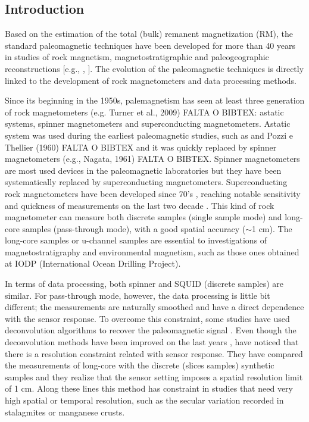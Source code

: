 \documentclass[galley,gc]{agutex}
\begin{document}
\begin{article}




\section{Introduction}
\label{sec:Introduction}

Based on the estimation of the total (bulk) remanent magnetization (RM), 
the standard paleomagnetic techniques have been developed for more than 
40 years in studies of rock magnetism, magnetostratigraphic and 
paleogeographic reconstructions [e.g., \citeauthor{voo1993}, \citeyear{voo1993}]. 
The evolution of the paleomagnetic techniques is directly linked to 
the development of rock magnetometers and data processing methods. 

Since its beginning in the 1950s, 
palemagnetism has seen at least three generation of rock magnetometers 
(e.g. Turner et al., 2009) FALTA O BIBTEX: astatic systems, 
spinner magnetometers and superconducting magnetometers. 
Astatic system was used during the earliest paleomagnetic studies, 
such as \citet{blackett1952} and Pozzi e Thellier (1960) FALTA O BIBTEX 
and it was quickly replaced by spinner magnetometers (e.g., Nagata, 1961) FALTA O BIBTEX. 
Spinner magnetometers are most used devices in the paleomagnetic 
laboratories but they have been systematically replaced by 
superconducting magnetometers. Superconducting rock magnetometers 
have been developed since 70’s \citep{dodson1974, goree-fuller1976}, 
reaching notable sensitivity and quickness of measurements on the last two decade 
\citep{kirschvink2015}. 
This kind of rock magnetometer can measure both discrete samples 
(single sample mode) and long-core samples (pass-through mode), 
with a good spatial accuracy ($\sim$1 cm).
The long-core samples or u-channel samples are essential to 
investigations of magnetostratigraphy and environmental magnetism, 
such as those ones obtained at IODP (International Ocean Drilling Project). 

In terms of data processing, both spinner and SQUID (discrete samples) 
are similar. For pass-through mode, however, the data 
processing is little bit different; the measurements are naturally 
smoothed and have a direct dependence with the sensor response. 
To overcome this constraint, some studies have used deconvolution 
algorithms to recover the paleomagnetic signal 
\citep{jackson2010, oda-xuan2014}. 
Even though the deconvolution methods have been improved on the 
last years \citep{jackson2010, lascu2012}, \citet{lascu2012} have 
noticed that there is a resolution constraint related with sensor 
response. They have compared the measurements of long-core with 
the discrete (slices samples) synthetic samples and they realize 
that the sensor setting imposes a spatial resolution limit of 1 cm. 
Along these lines this method has constraint in studies that need 
very high spatial or temporal resolution, such as the secular 
variation recorded in stalagmites or manganese crusts. 


\end{article}
\end{document}
